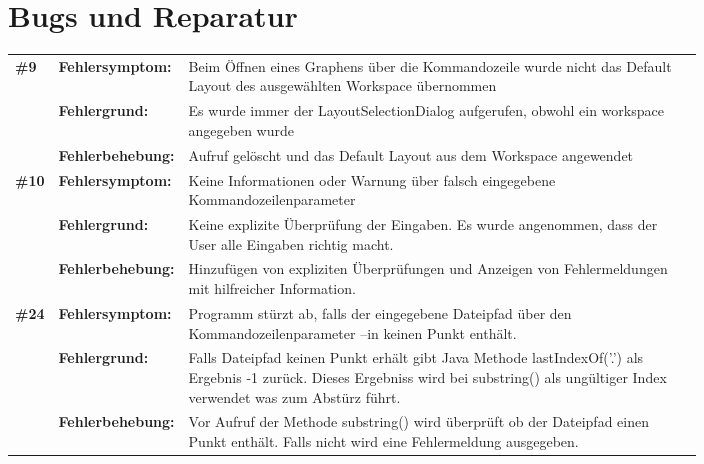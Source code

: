 \chapter{Bugs und Reparatur}
\label{ch:bugsundreparatur}

\newcommand{\bug}[4]{\textbf{\##1} & \textbf{Fehlersymptom:} & #2 \\ & \textbf{Fehlergrund:} & #3 \\ & \textbf{Fehlerbehebung:} & #4 \\ [1ex] }


\begin{longtable}{llp{0.8\linewidth}}

\bug{9}
       {Beim Öffnen eines Graphens über die Kommandozeile wurde nicht das Default Layout des ausgewählten Workspace übernommen}
       {Es wurde immer der LayoutSelectionDialog aufgerufen, obwohl ein workspace angegeben wurde}
       {Aufruf gelöscht und das Default Layout aus dem Workspace angewendet}

\bug{10}
       {Keine Informationen oder Warnung über falsch eingegebene Kommandozeilenparameter}
       {Keine explizite Überprüfung der Eingaben. Es wurde angenommen, dass der User alle Eingaben richtig macht.}
       {Hinzufügen von expliziten Überprüfungen und Anzeigen von Fehlermeldungen mit hilfreicher Information.}

\bug{24}
       {Programm stürzt ab, falls der eingegebene Dateipfad über den Kommandozeilenparameter --in keinen Punkt enthält. }
       {Falls Dateipfad keinen Punkt erhält gibt Java Methode lastIndexOf('.') als Ergebnis -1 zurück. Dieses Ergebniss wird bei substring() als ungültiger Index verwendet was zum Abstürz führt.}
       {Vor Aufruf der Methode substring() wird überprüft ob der Dateipfad einen Punkt enthält. Falls nicht wird eine Fehlermeldung ausgegeben.}
		
\end{longtable}